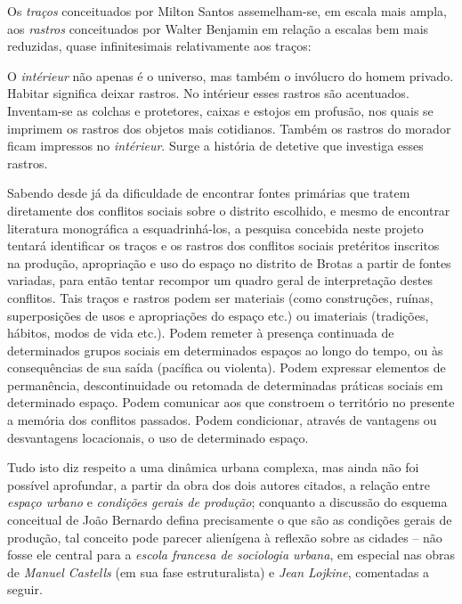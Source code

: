 Os \textit{traços} conceituados por Milton Santos assemelham-se, em escala mais ampla, aos \textit{rastros} conceituados por Walter Benjamin em relação a escalas bem mais reduzidas, quase infinitesimais relativamente aos traços:

\begin{citacao}
O \textit{intérieur} não apenas é o universo, mas também o invólucro do homem privado. Habitar significa deixar rastros. No intérieur esses rastros são acentuados. Inventam-se as colchas e protetores, caixas e estojos em profusão, nos quais se imprimem os rastros dos objetos mais cotidianos. Também os rastros do morador ficam impressos no \textit{intérieur}. Surge a história de detetive que investiga esses rastros. \cite[p.~46]{benjamin_passagens_2006}
\end{citacao}

Sabendo desde já da dificuldade de encontrar fontes primárias que tratem diretamente dos conflitos sociais sobre o distrito escolhido, e mesmo de encontrar literatura monográfica a esquadrinhá-los, a pesquisa concebida neste projeto tentará identificar os traços e os rastros dos conflitos sociais pretéritos inscritos na produção, apropriação e uso do espaço no distrito de Brotas a partir de fontes variadas, para então tentar recompor um quadro geral de interpretação destes conflitos. Tais traços e rastros podem ser materiais (como construções, ruínas, superposições de usos e apropriações do espaço etc.) ou imateriais (tradições, hábitos, modos de vida etc.). Podem remeter à presença continuada de determinados grupos sociais em determinados espaços ao longo do tempo, ou às consequências de sua saída (pacífica ou violenta). Podem expressar elementos de permanência, descontinuidade ou retomada de determinadas práticas sociais em determinado espaço. Podem comunicar aos que constroem o território no presente a memória dos conflitos passados. Podem condicionar, através de vantagens ou desvantagens locacionais, o uso de determinado espaço. 

Tudo isto diz respeito a uma dinâmica urbana complexa, mas ainda não foi possível aprofundar, a partir da obra dos dois autores citados, a relação entre \textit{espaço urbano} e \textit{condições gerais de produção}; conquanto a discussão do esquema conceitual de João Bernardo defina precisamente o que são as condições gerais de produção, tal conceito pode parecer alienígena à reflexão sobre as cidades -- não fosse ele central para a \textit{escola francesa de sociologia urbana}, em especial nas obras de \textit{Manuel Castells} (em sua fase estruturalista) e \textit{Jean Lojkine}, comentadas a seguir.


